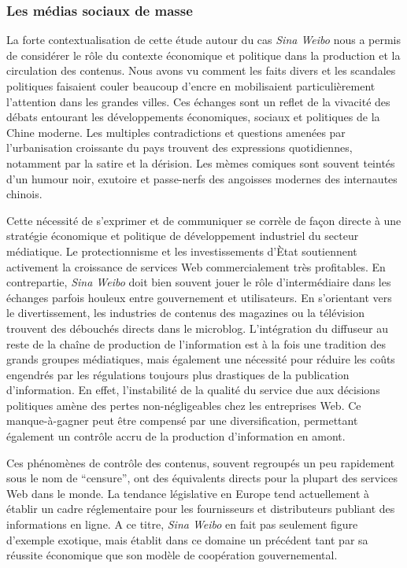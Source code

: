 \subsubsection{Les médias sociaux de masse} %

La forte contextualisation de cette étude autour du cas \textit{Sina Weibo} nous a permis de considérer le rôle du contexte économique et politique dans la production et la circulation des contenus. Nous avons vu comment les faits divers et les scandales politiques faisaient couler beaucoup d'encre en mobilisaient particulièrement l'attention dans les grandes villes. Ces échanges sont un reflet de la vivacité des débats entourant les développements économiques, sociaux et politiques de la Chine moderne. Les multiples contradictions et questions amenées par l'urbanisation croissante du pays trouvent des expressions quotidiennes, notamment par la satire et la dérision. Les mèmes comiques sont souvent teintés d'un humour noir, exutoire et passe-nerfs des angoisses modernes des internautes chinois. 

Cette nécessité de s'exprimer et de communiquer se corrèle de façon directe à une stratégie économique et politique de développement industriel du secteur médiatique. Le protectionnisme et les investissements d'Ètat soutiennent activement la croissance de services Web commercialement très profitables. En contrepartie, \textit{Sina Weibo} doit bien souvent jouer le rôle d'intermédiaire dans les échanges parfois houleux entre gouvernement et utilisateurs. En s'orientant vers le divertissement, les industries de contenus des magazines ou la télévision trouvent des débouchés directs dans le microblog. L'intégration du diffuseur au reste de la chaîne de production de l'information est à la fois une tradition des grands groupes médiatiques, mais également une nécessité pour réduire les coûts engendrés par les régulations toujours plus drastiques de la publication d'information. En effet, l'instabilité de la qualité du service due aux décisions politiques amène des pertes non-négligeables chez les entreprises Web. Ce manque-à-gagner peut être compensé par une diversification, permettant également un contrôle accru de la production d'information en amont. 

Ces phénomènes de contrôle des contenus, souvent regroupés un peu rapidement sous le nom de ``censure'',  ont des équivalents directs pour la plupart des services Web dans le monde. La tendance législative en Europe tend actuellement à établir un cadre réglementaire pour les fournisseurs et distributeurs publiant des informations en ligne. A ce titre, \textit{Sina Weibo} en fait  pas seulement figure d'exemple exotique, mais établit dans ce domaine un précédent tant par sa réussite économique que son modèle de coopération gouvernemental.


